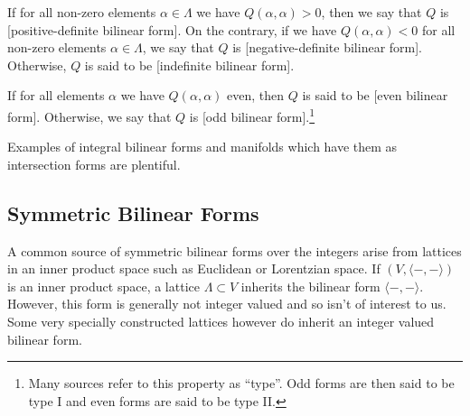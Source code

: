 \begin{definition}[Definiteness]
	If for all non-zero elements $\alpha\in \Lambda$ we have $Q(\alpha,\alpha)>0$, then we say that $Q$ is [positive-definite bilinear form]. On the contrary, if we have $Q(\alpha,\alpha)<0$ for all non-zero elements $\alpha\in \Lambda$, we say that $Q$ is [negative-definite bilinear form]. Otherwise, $Q$ is said to be [indefinite bilinear form].
\end{definition}

\begin{definition}[Parity]
	If for all elements $\alpha$ we have $Q(\alpha,\alpha)$ even, then $Q$ is said to be [even bilinear form]. Otherwise, we say that $Q$ is [odd bilinear form].\footnote{Many sources refer to this property as ``type''. Odd forms are then said to be type I and even forms are said to be type II.}
\end{definition}

Examples of integral bilinear forms and manifolds which have them as intersection forms are plentiful.



\subsection{Symmetric Bilinear Forms}

A common source of symmetric bilinear forms over the integers arise from lattices in an inner product space such as Euclidean or Lorentzian space. If $(V,\langle -,-\rangle)$ is an inner product space, a lattice $\Lambda\subset V$ inherits the bilinear form $\langle -,-\rangle$. However, this form is generally not integer valued and so isn't of interest to us. Some very specially constructed lattices however do inherit an integer valued bilinear form.


